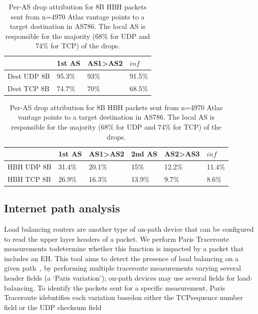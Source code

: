 \documentclass[conference]{IEEEtran}
\begin{document}
\begin{table}
\centering
\caption{Per-AS drop attribution for 8B DST packets sent from n=4970 Atlas vantage points to a target destination in AS786. The local AS is responsible for the majority (5\% for UDP and 25\% for TCP) of the drops.}
 \label{tbl:uk_as1}

\begin{tabular}{l|l|l|l}
                                   & 1st AS & AS1\textgreater AS2 & $inf $     \\ \hline 

{Dest UDP 8B} & 95.3\% & 93\%                 & 91.5\% \\ \hline

{Dest TCP 8B} & 74.7\% & 70\%                 & 68.5\%
\end{tabular}
\bigskip
\caption{Per-AS drop attribution for 8B HBH packets sent from n=4970  Atlas vantage points to a target destination in AS786. The local AS is responsible for the majority (68\% for UDP and 74\% for TCP) of the drops.}
\begin{tabular}{p{}|l|l|l|l|l}

              & 1st AS & AS1\textgreater{}AS2 & 2nd AS & AS2\textgreater{}AS3 & $inf$     \\ \hline
HBH UDP 8B & 31.4\% & 20.1\%               & 15\%   & 12.2\%               & 11.4\% \\ \hline
HBH TCP 8B & 26.9\% & 16.3\%               & 13.9\% & 9.7\%                & 8.6\%  \\ 
\end{tabular}
 \label{tbl:uk_as2}
\end{table}


\subsection{Internet path analysis}

Load balancing routers are another type of on-path device that can be configured to read  the upper layer headers of a packet. We perform Paris Traceroute measurements todetermine whether this function is impacted by a packet that includes an EH. This tool aims to detect the presence of load balancing on a given path~\cite{augustin2006avoiding}, by performing multiple traceroute measurements varying several header fields (a `Paris variation'); on-path devices may use several fields for load-balancing. To identify the packets sent for a specific measurement, Paris Traceroute idebntifies each variation basedon either the TCPsequence number field or the UDP checksum field
\end{document}
